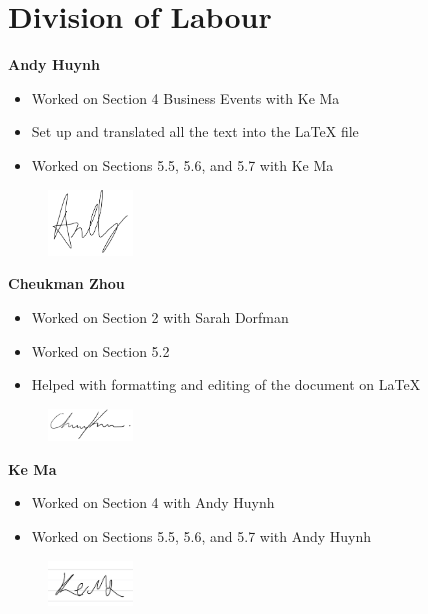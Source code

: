 \appendix
\section{Division of Labour}
\label{sec:division_of_labour}

\textbf{Andy Huynh}
\begin{itemize}
    \item Worked on Section 4 Business Events with Ke Ma
    \item Set up and translated all the text into the LaTeX file
    \item Worked on Sections 5.5, 5.6, and 5.7 with Ke Ma
\end{itemize}
\begin{figure}[H]
	\centering
	\includegraphics[width=0.2\textwidth]{Signatures/a.png}  
\end{figure}

\textbf{Cheukman Zhou}
\begin{itemize}
    \item Worked on Section 2 with Sarah Dorfman
    \item Worked on Section 5.2
    \item Helped with formatting and editing of the document on LaTeX
\end{itemize}
\begin{figure}[H]
	\centering
	\includegraphics[width=0.2\textwidth]{Signatures/c.png}
\end{figure}

\textbf{Ke Ma}
\begin{itemize}
    \item Worked on Section 4 with Andy Huynh
    \item Worked on Sections 5.5, 5.6, and 5.7 with Andy Huynh
\end{itemize}
\begin{figure}[H]
	\centering
	\includegraphics[width=0.2\textwidth]{Signatures/k.png}
\end{figure}

